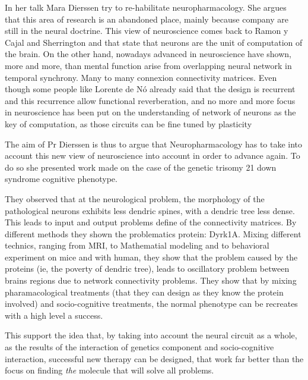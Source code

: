 \documentclass[10pt,letterpaper]{article}
\begin{document}
In her talk Mara Dierssen try to re-habilitate neuropharmacology. She argues that this area of research is an 
 abandoned place, mainly because company are still in the neural doctrine. This view of neuroscience comes back to Ramon y Cajal and Sherrington and that state that neurons are the unit of computation of the brain. 
On the other hand, nowadays advanced in neuroscience have shown, more and more, than mental function arise from overlapping neural network in temporal synchrony. Many to many connexion connectivity matrices. Even though some people like Lorente de Nó already said that the design is recurrent and this recurrence allow functional reverberation, and no more and more focus in neuroscience has been put on the understanding of network of neurons as the key of computation, as those circuits can be fine tuned by plasticity

The aim of Pr Dierssen is thus to argue that Neuropharmacology has to take into account this new view of neuroscience into account in order to advance again. To do so she presented work made on the case of the genetic trisomy 21 down syndrome cognitive phenotype.

They observed that at the neurological problem, the morphology of the pathological neurons exhibits less dendric spines, with a dendric tree less dense. This leads to input and output problems  define of the connectivity matrices. By different methods they shown the problematics protein: Dyrk1A. Mixing different technics, ranging from MRI, to Mathematial modeling and to behavioral experiment on mice and with human, they show that the problem caused by the proteins (ie, the poverty of dendric tree),  leads to oscillatory problem between brains regions due to network connectivity problems. They show that by mixing pharamacological treatments (that they can design as they know the protein involved) and socio-cognitive treatments, the normal phenotype can be recreates with a high level a success. 

This support the idea that, by taking into account the neural circuit as a whole, as the results of the interaction of genetics component and socio-cognitive interaction, successful new therapy can be designed, that work far better than the focus on finding \emph{the} molecule that will solve all problems.
\end{document}
